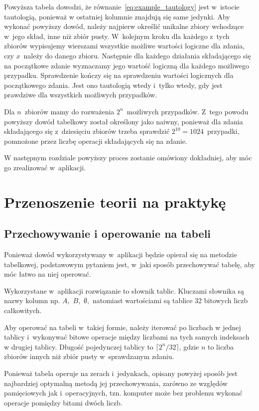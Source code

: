 \documentclass{SGGW-thesis}
\begin{document}
\begin{paragraph}{}
    Powyższa tabela dowodzi, że równanie~\eqref{eq:example_tautology} jest w~istocie tautologią, ponieważ w ostatniej kolumnie znajdują się same jedynki.
    Aby wykonać powyższy dowód, należy najpierw określić unikalne zbiory wchodzące w~jego skład, inne niż zbiór pusty.
    W~kolejnym kroku dla każdego z~tych zbiorów wypisujemy wierszami wszystkie możliwe wartości logiczne dla zdania, czy $x$~należy do danego zbioru. Następnie dla każdego działania składającego się na początkowe zdanie wyznaczamy jego wartość logiczną dla każdego możliwego przypadku. 
    Sprawdzenie kończy się na sprawdzeniu wartości logicznych dla początkowego zdania. Jest ono tautologią wtedy i~tylko wtedy, gdy jest prawdziwe dla wszystkich możliwych przypadków.

    Dla $n$~zbiorów mamy do rozważenia $2^{n}$~możliwych przypadków. Z~tego powodu powyższy dowód tabelkowy został określony jako naiwny, ponieważ dla zdania składającego się z~dziesięciu zbiorów trzeba sprawdzić $2^{10}=1024$~przypadki, pomnożone przez liczbę operacji składających się na zdanie.

    W następnym rozdziale powyższy proces zostanie omówiony dokładniej, aby móc go zrealizować w~aplikacji.
\end{paragraph}

\chapter{Przenoszenie teorii na praktykę}

\section{Przechowywanie i operowanie na tabeli\label{sec:3.1}}

\begin{paragraph}{}
    Ponieważ dowód wykorzystywany w~aplikacji będzie opierał się na metodzie tabelkowej, podstawowym pytaniem jest, w~jaki sposób przechowywać tabelę, aby móc łatwo na niej operować.

    Wykorzystane w~aplikacji rozwiązanie to słownik tablic. Kluczami słownika są nazwy kolumn np. $A$,~$B$,~$\emptyset$,~natomiast wartościami są tablice 32 bitowych liczb całkowitych.

    Aby operować na tabeli w~takiej formie, należy iterować po liczbach w jednej tablicy i~wykonywać bitowe operacje między liczbami na tych samych indeksach w drugiej tablicy. Długość pojedynczej tablicy to $\lceil 2^{n} / 32 \rceil$, gdzie $n$ to liczba zbiorów innych niż zbiór pusty w~sprawdzanym zdaniu.

    Ponieważ tabela operuje na zerach i~jedynkach, opisany powyżej sposób jest najbardziej optymalną metodą jej przechowywania, zarówno ze względów pamięciowych jak i~operacyjnych, tzn. komputer może bez problemu wykonać operacje pomiędzy bitami dwóch liczb.
\end{paragraph}
\end{document}
